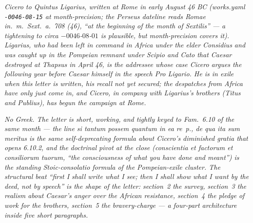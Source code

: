 
\textit{Cicero to Quintus Ligarius, written at Rome in early
August 46 BC (works.yaml \texttt{-0046-08-15} at month-precision;
the Perseus dateline reads \textit{Romae in.~m.~Sext.~a.~708 (46)},
``at the beginning of the month of Sextilis'' --- a tightening to
\textit{circa} ${-}0046$-$08$-$01$ is plausible, but
month-precision covers it). Ligarius, who had been left in
command in Africa under the elder Considius and was caught up in
the Pompeian remnant under Scipio and Cato that Caesar destroyed
at Thapsus in April 46, is the addressee whose case Cicero argues
the following year before Caesar himself in the speech
\textit{Pro Ligario}. He is in exile when this letter is written,
his recall not yet secured; the despatches from Africa have only
just come in, and Cicero, in company with Ligarius's brothers
(Titus and Publius), has begun the campaign at Rome.}

\textit{No Greek. The letter is short, working, and tightly
keyed to \textit{Fam.}~6.10 of the same month --- the line
\textit{si tantum possem quantum in ea re~p., de qua ita sum
meritus} is the same self-deprecating formula about Cicero's
diminished \textit{gratia} that opens 6.10.2, and the doctrinal
pivot at the close (\textit{conscientia et factorum et consiliorum
tuorum}, ``the consciousness of what you have done and meant'')
is the standing Stoic-consolatio formula of the Pompeian-exile
cluster. The structural beat ``first I shall write what I see;
then I shall show what I want by the deed, not by speech'' is the
shape of the letter: section~2 the survey, section~3 the realism
about Caesar's anger over the African resistance, section~4 the
pledge of work for the brothers, section~5 the bravery-charge ---
a four-part architecture inside five short paragraphs.}
